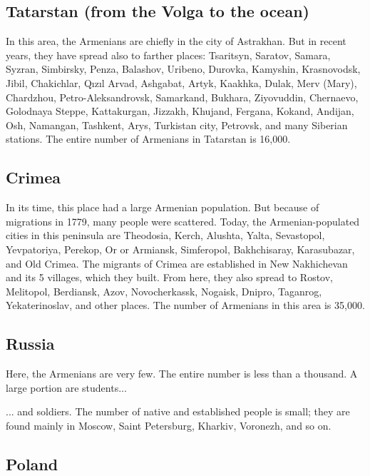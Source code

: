 \subsection{Tatarstan (from the Volga to the ocean)}

In this area, the Armenians are chiefly in the city of Astrakhan. But in recent years, they have spread also to farther places: Tsaritsyn, Saratov, Samara, Syzran, Simbirsky, Penza, Balashov, Uribeno, Durovka, Kamyshin, Krasnovodsk, Jibil, Chakichlar, Qızıl Arvad, Ashgabat, Artyk, Kaakhka, Dulak, Merv (Mary), Chardzhou, Petro-Aleksandrovsk, Samarkand, Bukhara, Ziyovuddin, Chernaevo, Golodnaya Steppe, Kattakurgan, Jizzakh, Khujand, Fergana, Kokand, Andijan, Osh, Namangan, Tashkent, Arys, Turkistan city, Petrovsk, and many Siberian stations. The entire number of Armenians in Tatarstan is 16,000.

\subsection{Crimea}

In its time, this place had a large Armenian population. But because of migrations in 1779, many people were scattered. Today, the Armenian-populated cities in this peninsula are Theodosia, Kerch, Alushta, Yalta, Sevastopol, Yevpatoriya, Perekop, Or or Armiansk, Simferopol, Bakhchisaray, Karasubazar, and Old Crimea. The migrants of Crimea are established in New Nakhichevan and its 5 villages, which they built. From here, they also spread to Rostov, Melitopol, Berdiansk, Azov, Novocherkassk, Nogaisk, Dnipro, Taganrog, Yekaterinoslav, and other places. The number of Armenians in this area is 35,000. 

\subsection{Russia}

Here, the Armenians are very few. The entire number is less than a thousand. A large portion are students... 
\begin{adjarianpage}\label{page:27}\end{adjarianpage}%

... and soldiers. The number of native and established people is small; they are found mainly in Moscow, Saint Petersburg, Kharkiv, Voronezh, and so on. 

\subsection{Poland}


